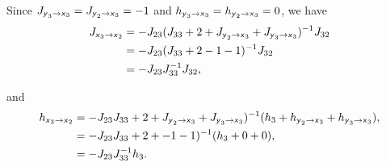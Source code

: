 \documentclass{article}
\newcommand{\s}[1]{\textsf{\textit{#1}}}
\begin{document}
Since $J_{\s{y}_3\to\s{x}_3} = J_{\s{y}_2\to\s{x}_3} = -1$
and $h_{\s{y}_3\to\s{x}_3} = h_{\s{y}_2\to\s{x}_3} = 0$, we have
\begin{align*}
	J_{\s{x}_3\to\s{x}_2} &= -J_{23}(J_{33} + 2 + 
	J_{\s{y}_2\to\s{x}_3} + J_{\s{y}_3\to\s{x}_3})^{-1}J_{32}\\
	& = -J_{23}(J_{33} + 2 -1 -1)^{-1}J_{32}\\
	& = -J_{23}J_{33}^{-1}J_{32},
\end{align*}

and
\begin{align*}
	h_{\s{x}_3\to\s{x}_2} &= -J_{23}J_{33} + 2 + 
	J_{\s{y}_2\to\s{x}_3} + J_{\s{y}_3\to\s{x}_3})^{-1}
	(h_3+h_{\s{y}_2\to\s{x}_3} + h_{\s{y}_3\to\s{x}_3}),\\
	&= -J_{23}J_{33} + 2 + 
	-1 -1)^{-1}
	(h_3+0 + 0),\\
	&=-J_{23}J_{33}^{-1}h_{3}.
\end{align*}
\end{document}
